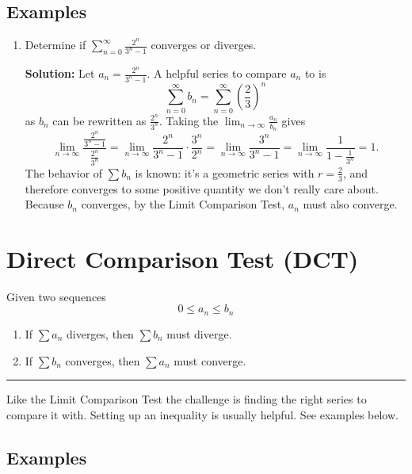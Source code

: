 \documentclass[12pt]{report}
\begin{document}
\subsection*{Examples}
\begin{enumerate}
    \item Determine if $\sum_{n=0}^{\infty} \frac{2^n}{3^n-1}$ converges or diverges.
    
    \textbf{Solution:} Let $a_n = \frac{2^n}{3^n-1}$. A helpful series to compare $a_n$ to is
        $$\sum_{n=0}^{\infty} b_n = \sum_{n=0}^{\infty} \left( \frac{2}{3} \right)^n$$
    as $b_n$ can be rewritten as $\frac{2^n}{3^n}$. Taking the $\lim_{n\to\infty} \frac{a_n}{b_n}$ gives
        \[
        \lim_{n\to\infty} \frac{\frac{2^n}{3^n-1}}{\frac{2^n}{3^n}} =
        \lim_{n\to\infty} \frac{2^n}{3^n-1} \cdot \frac{3^n}{2^n} =
        \lim_{n\to\infty} \frac{3^n}{3^n-1} = 
        \lim_{n\to\infty} \frac{1}{1 - \frac{1}{3^n}} = 1.
        \]
    The behavior of $\sum b_n$ is known: it's a geometric series with $r = \frac{2}{3}$, and therefore converges to some positive quantity we don't really care about. Because $b_n$ converges, by the Limit Comparison Test, $a_n$ must also converge.
    
\end{enumerate}


\clearpage




\section{Direct Comparison Test (DCT)}
Given two sequences
	$$ 0 \leq a_n \leq b_n $$

\begin{enumerate}
	\item If $\sum a_n$ diverges, then $\sum b_n$ must diverge.
	\item If $\sum b_n$ converges, then $\sum a_n$ must converge.
\end{enumerate}


\begin{center}
    \noindent\rule{1cm}{0.4pt}
\end{center}


\noindent Like the Limit Comparison Test the challenge is finding the right series to compare it with. Setting up an inequality is usually helpful. See examples below. 

\subsection*{Examples}
\end{document}
